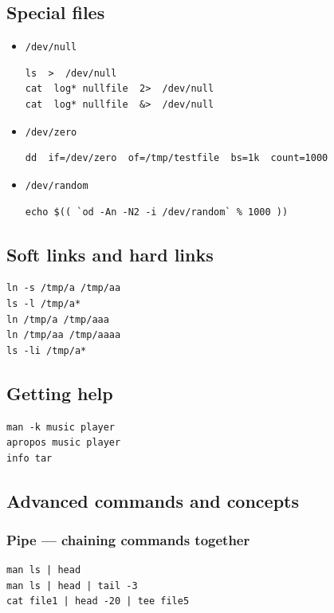 \documentclass[12pt]{article}
\begin{document}
\subsection{Special files}
\label{sec-2-7}
\begin{itemize}
\item \texttt{/dev/null}
\begin{verbatim}
ls  >  /dev/null
cat  log* nullfile  2>  /dev/null
cat  log* nullfile  &>  /dev/null  
\end{verbatim}
\end{itemize}
\begin{itemize}
\item \texttt{/dev/zero}
\begin{verbatim}
dd  if=/dev/zero  of=/tmp/testfile  bs=1k  count=1000
\end{verbatim}
\item \texttt{/dev/random}
\begin{verbatim}
echo $(( `od -An -N2 -i /dev/random` % 1000 ))
\end{verbatim}
\end{itemize}
\subsection{Soft links and hard links}
\label{sec-2-8}
\begin{verbatim}
ln -s /tmp/a /tmp/aa
ls -l /tmp/a*
ln /tmp/a /tmp/aaa
ln /tmp/aa /tmp/aaaa
ls -li /tmp/a*
\end{verbatim}
\subsection{Getting help}
\label{sec-2-9}
\begin{verbatim}
man -k music player
apropos music player
info tar
\end{verbatim}
\subsection{Advanced commands and concepts}
\label{sec-2-10}
\subsubsection{Pipe --- chaining commands together}
\label{sec-2-10-1}
\begin{verbatim}
man ls | head
man ls | head | tail -3
cat file1 | head -20 | tee file5
\end{verbatim}
\end{document}
